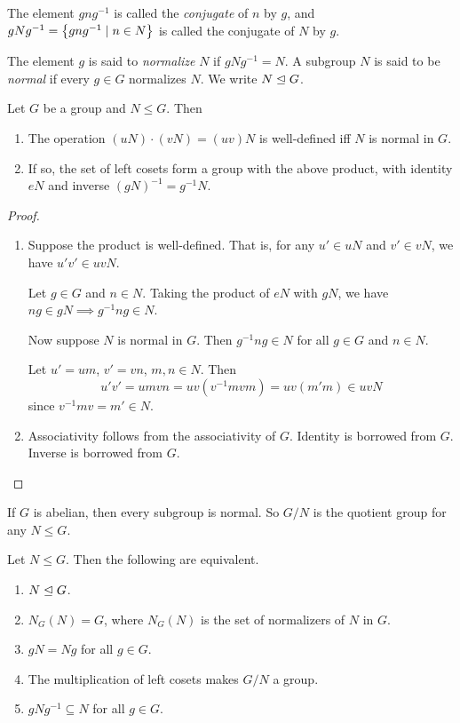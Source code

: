 \begin{definition*}[Normal] \label{def:group:normal}
    The element $gng^{-1}$ is called the \emph{conjugate} of $n$ by $g$,
    and $gNg^{-1} = \set{gng^{-1} \mid n \in N}$ is called the conjugate
    of $N$ by $g$.

    The element $g$ is said to \emph{normalize} $N$ if $gNg^{-1} = N$.
    A subgroup $N$ is said to be \emph{normal} if every $g \in G$
    normalizes $N$.
    We write $N \trianglelefteq G$.
\end{definition*}
\begin{proposition}
    Let $G$ be a group and $N \le G$.
    Then
    \begin{enumerate}
        \item The operation $(uN) \cdot (vN) = (uv)N$ is well-defined iff
            $N$ is normal in $G$.
        \item If so, the set of left cosets form a group with the above
            product, with identity $eN$ and inverse $(gN)^{-1} = g^{-1}N$.
    \end{enumerate}
\end{proposition}
\begin{proof} \leavevmode
    \begin{enumerate}
        \item Suppose the product is well-defined.
        That is, for any $u' \in uN$ and $v' \in vN$,
        we have $u'v' \in uvN$.

        Let $g \in G$ and $n \in N$.
        Taking the product of $eN$ with $gN$, we have
        $ng \in gN \implies g^{-1}ng \in N$.

        Now suppose $N$ is normal in $G$.
        Then $g^{-1}ng \in N$ for all $g \in G$ and $n \in N$.

        Let $u' = um$, $v' = vn$, $m, n \in N$.
        Then \[
            u'v' = umvn = uv(v^{-1}mvm) = uv(m'm) \in uvN
        \] since $v^{-1}mv = m' \in N$.
        \item Associativity follows from the associativity of $G$.
        Identity is borrowed from $G$.
        Inverse is borrowed from $G$. \qedhere
    \end{enumerate}
\end{proof}
\begin{example}
    If $G$ is abelian, then every subgroup is normal.
    So $G/N$ is the quotient group for any $N \le G$.
\end{example}

\begin{theorem}
    Let $N \le G$.
    Then the following are equivalent.
    \begin{enumerate}
        \item $N \trianglelefteq G$.
        \item $N_G(N) = G$, where $N_G(N)$ is the set of normalizers
            of $N$ in $G$.
        \item $gN = Ng$ for all $g \in G$.
        \item The multiplication of left cosets makes $G/N$ a group.
        \item $gNg^{-1} \subseteq N$ for all $g \in G$.
    \end{enumerate}
\end{theorem}

